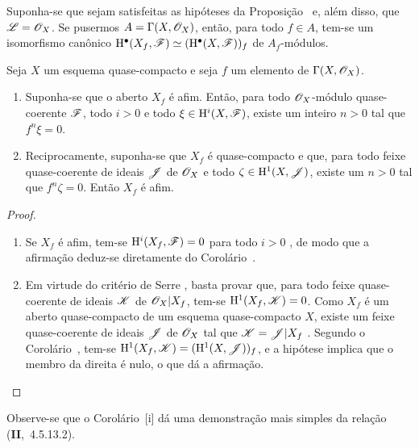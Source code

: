 \begin{corollary}[1.4.6]
\label{III.1.4.6}
Suponha-se que sejam satisfeitas as hipóteses da Proposição~ e, além disso, que $\mathscr{L}=\mathscr{O}_X$.
Se pusermos $A=\Gamma(X,\mathscr{O}_X)$, então, para todo $f\in A$, tem-se um isomorfismo canônico $\mathrm{H}^\bullet(X_f,\mathscr{F})\simeq(\mathrm{H}^\bullet(X,\mathscr{F}))_f$ de $A_f$-módulos.
\end{corollary}

\begin{corollary}[1.4.7]
\label{III.1.4.7}
Seja $X$ um esquema quase-compacto e seja $f$ um elemento de $\Gamma(X,\mathscr{O}_X)$.
\begin{enumerate}
  \item[{\rm(i)}] Suponha-se que o aberto $X_f$ é afim.
    Então, para todo $\mathscr{O}_X$-módulo quase-coerente $\mathscr{F}$, todo $i>0$ e todo $\xi\in\mathrm{H}^i(X,\mathscr{F})$, existe um inteiro $n>0$ tal que $f^n\xi=0$.
  \item[{\rm(ii)}] Reciprocamente, suponha-se que $X_f$ é quase-compacto e que, para todo feixe quase-coerente de ideais $\mathscr{J}$ de $\mathscr{O}_X$ e todo $\zeta\in\mathrm{H}^1(X,\mathscr{J})$, existe um $n>0$ tal que $f^n\zeta=0$.
    Então $X_f$ é afim.
\end{enumerate}
\end{corollary}

\begin{proof}
\medskip\noindent
\begin{enumerate}
  \item[(i)] Se $X_f$ é afim, tem-se $\mathrm{H}^i(X_f,\mathscr{F})=0$ para todo $i>0$ , de modo que a afirmação deduz-se diretamente do Corolário~.
  \item[(ii)] Em virtude do critério de Serre , basta provar que, para todo feixe quase-coerente de ideais $\mathscr{K}$ de $\mathscr{O}_X|X_f$, tem-se $\mathrm{H}^1(X_f,\mathscr{K})=0$.
    Como $X_f$ é um aberto quase-compacto de um esquema quase-compacto $X$, existe um feixe quase-coerente de ideais $\mathscr{J}$ de $\mathscr{O}_X$ tal que $\mathscr{K}=\mathscr{J}|X_f$ .
    Segundo o Corolário~, tem-se $\mathrm{H}^1(X_f,\mathscr{K})=(\mathrm{H}^1(X,\mathscr{J}))_f$, e a hipótese implica que o membro da direita é nulo, o que dá a afirmação.
\end{enumerate}
\end{proof}

\begin{remark}[1.4.8]
\label{III.1.4.8}
Observe-se que o Corolário~[i] dá uma demonstração mais simples da relação (\textbf{II},~4.5.13.2).
\end{remark}

